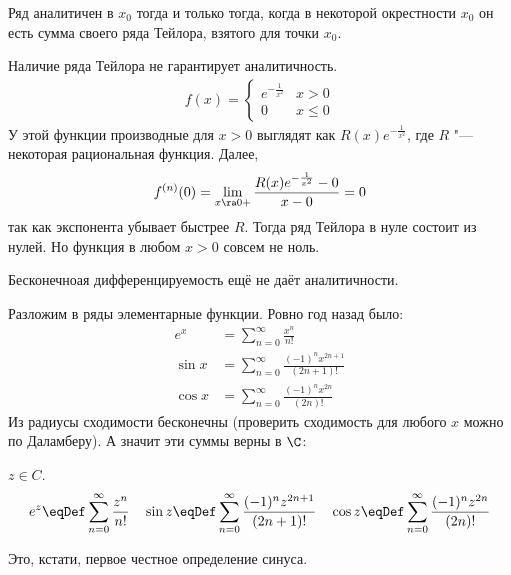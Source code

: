 \begin{conseq}
	Ряд аналитичен в $x_0$ тогда и только тогда, когда в некоторой окрестности $x_0$ он есть сумма своего ряда Тейлора, взятого для точки $x_0$.
\end{conseq}

\begin{exmp}
	Наличие ряда Тейлора не гарантирует аналитичность.
	\begin{gather*}
		f(x) = \begin{cases}
			e^{-\frac1{x^2}} & x > 0 \\
			0 & x \le 0
		\end{cases}
	\end{gather*}
	У этой функции производные для $x>0$ выглядят как $R(x)e^{-\frac1{x^2}}$, где $R$ "--- некоторая рациональная функция.
	Далее,
	\[
		f^{(n)}(0) = \lim_{x \ra 0+} \frac{R(x)e^{-\frac1{x^2}} - 0}{x - 0} = 0
	\]
	так как экспонента убывает быстрее $R$.
	Тогда ряд Тейлора в нуле состоит из нулей.
	Но функция в любом $x > 0$ совсем не ноль.
\end{exmp}

\begin{Rem}
	Бесконечноая дифференцируемость ещё не даёт аналитичности.
\end{Rem}

Разложим в ряды элементарные функции.
Ровно год назад было:
\begin{align*}
	e^x &= \sum_{n=0}^\infty \frac{x^n}{n!} \\
	\sin x &= \sum_{n=0}^\infty \frac{(-1)^n x^{2n+1}}{(2n+1)!} \\
	\cos x &= \sum_{n=0}^\infty \frac{(-1)^n x^{2n}}{(2n)!}
\end{align*}
Из радиусы сходимости бесконечны (проверить сходимость для любого $x$ можно по Даламберу).
А значит эти суммы верны в $\C$:
\begin{Def}
	$z \in C$.
	\[
		e^z \eqDef \sum_{n=0}^\infty \frac{z^n}{n!} \quad
		\sin z \eqDef \sum_{n=0}^\infty \frac{(-1)^n z^{2n+1}}{(2n+1)!} \quad
		\cos z \eqDef \sum_{n=0}^\infty \frac{(-1)^n z^{2n}}{(2n)!}
	\]
\end{Def}
Это, кстати, первое честное определение синуса.

